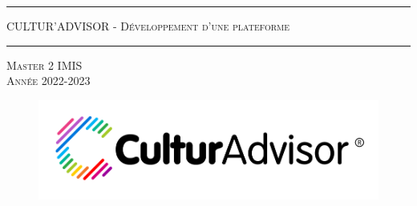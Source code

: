 \documentclass{article}
\begin{document}
\hrule
\begin{center}
\Huge {\textsc{CULTUR'ADVISOR - Développement d'une plateforme}}
\end{center}
\hrule
\vspace{10mm}
\begin{center}
\Large \textsc{Master 2 IMIS \\ Année 2022-2023}
\end{center}
\vspace{15mm}
\begin{figure}[H]
\hspace{-10mm}
\includegraphics[scale = 0.5]{images/logo_advisor.png}
\end{figure}
\vspace{20mm}
\end{document}
